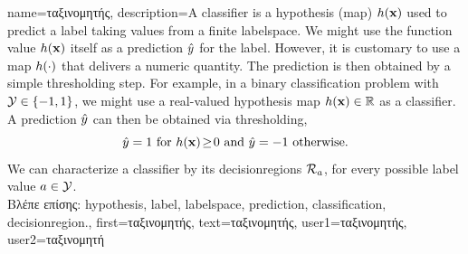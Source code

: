 {
	name={\foreignlanguage{greek}{ταξινομητής}},
	description={A classifier is a \gls{hypothesis} (map) $h({\bf x})$ 
		used to predict a \gls{label} taking values from a finite \gls{labelspace}. We might use the 
		function value $h({\bf x})$ itself as a \gls{prediction} $\hat{y}$ for 
		the \gls{label}. However, it is customary to use a map $h(\cdot)$ that delivers 
		a numeric quantity. The \gls{prediction} is then obtained by a simple thresholding step. 
		For example, in a binary \gls{classification} problem with \label{labelspace} $\mathcal{Y} \in  \{ -1,1\}$, 
		we might use a real-valued \gls{hypothesis} map $h({\bf x}) \in \mathbb{R}$ 
		as a classifier. A \gls{prediction} $\hat{y}$ can then be obtained via thresholding,  
		 \begin{equation} 
		 	\label{equ_def_threshold_bin_classifier_dict}
		 	\hat{y} =1   \mbox{ for } h({\bf x})\!\geq\!0 \mbox{ and } 	\hat{y} =-1  \mbox{ otherwise.}
	 		\end{equation}
 		We can characterize a classifier by its \gls{decisionregion}s $\mathcal{R}_{a}$, for 
 		every possible \gls{label} value $a \in \mathcal{Y}$.\\
		\foreignlanguage{greek}{Βλέπε επίσης:} \gls{hypothesis}, \gls{label}, \gls{labelspace}, \gls{prediction}, \gls{classification}, \gls{decisionregion}.},
		first={\foreignlanguage{greek}{ταξινομητής}},
		text={\foreignlanguage{greek}{ταξινομητής}},
		user1={\foreignlanguage{greek}{ταξινομητής}}, %
		user2={\foreignlanguage{greek}{ταξινομητή}} %
}


